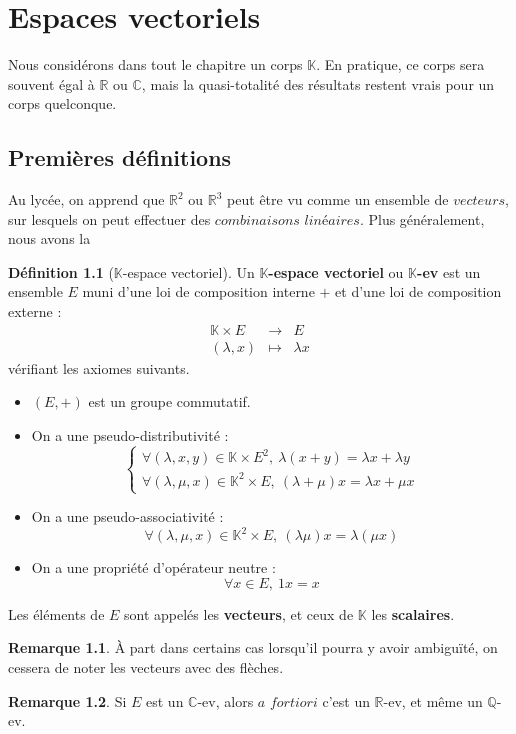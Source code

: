 \documentclass[french]{book}
\newcommand{\R}{\mathbb{R}}
\newcommand{\C}{\mathbb{C}}
\newcommand{\K}{\mathbb{K}}
\theoremstyle{plain}
\theoremstyle{definition}
\newtheorem{dfn}{Définition}[chapter]
\newtheorem{rmq}{Remarque}[chapter]
\theoremstyle{remark}
\begin{document}
\newpage
\chapter{Espaces vectoriels} %
Nous considérons dans tout le chapitre un corps $\K$. En pratique, ce corps sera souvent égal à $\R$ ou $\C$, mais la quasi-totalité des résultats restent vrais pour un corps quelconque.
\section{Premières définitions} %
Au lycée, on apprend que $\R^2$ ou $\R^3$ peut être vu comme un ensemble de $vecteurs$, sur lesquels on peut effectuer des $combinaisons$ $linéaires$. Plus généralement, nous avons la 
\begin{dfn}[$\K$-espace vectoriel]
	Un \textbf{$\K$-espace vectoriel} ou \textbf{$\K$-ev} est un ensemble $E$ muni d'une loi de composition interne $+$ et d'une loi de composition externe :
	$$\begin{array}{ccc}
		\K\times E&\rightarrow&E \\
		(\lambda, x)&\mapsto&\lambda x
	\end{array}$$ vérifiant les axiomes suivants. \begin{itemize}
	\item $(E,+)$ est un groupe commutatif.
	\item On a une pseudo-distributivité : $$\left \{\begin{array}{ll}\forall(\lambda,x,y)\in\K\times E^2,\ \lambda(x+y)=\lambda x+\lambda y\\ \forall(\lambda,\mu,x)\in\K^2\times E,\ (\lambda+\mu)x=\lambda x+\mu x\end{array}\right.$$
	\item On a une pseudo-associativité : $$\forall(\lambda,\mu,x)\in\K^2\times E,\ (\lambda\mu)x=\lambda(\mu x)$$
	\item On a une propriété d'opérateur neutre : $$\forall x\in E,\ 1x=x$$ 
	\end{itemize}
	Les éléments de $E$ sont appelés les \textbf{vecteurs}, et ceux de $\K$ les \textbf{scalaires}.
\end{dfn}
\begin{rmq}
	À part dans certains cas lorsqu'il pourra y avoir ambiguïté, on cessera de noter les vecteurs avec des flèches.
\end{rmq}
\begin{rmq}
	Si $E$ est un $\mathbb{C}$-ev, alors $a$ $fortiori$ c'est un $\mathbb{R}$-ev, et même un $\mathbb{Q}$-ev.
\end{rmq}
\end{document}
